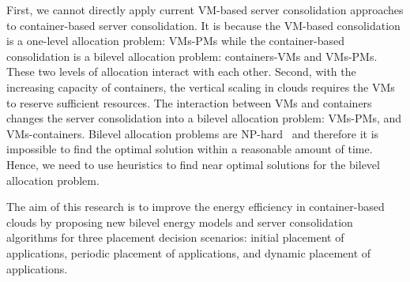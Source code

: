  First, we cannot directly apply current VM-based server consolidation approaches to container-based server consolidation. It is because the VM-based consolidation is a one-level allocation problem: VMs-PMs while the container-based consolidation is a bilevel allocation problem: containers-VMs and VMs-PMs. These two levels of allocation interact with each other. Second, with the increasing capacity of containers, the vertical scaling in clouds requires the VMs to reserve sufficient resources. The interaction between VMs and containers changes 
the server consolidation into a bilevel allocation problem: VMs-PMs, and VMs-containers. Bilevel allocation problems are NP-hard~\cite{Sinha:2013tn} and therefore it is impossible to find the optimal solution within a reasonable amount of time. Hence, we need to use heuristics to find near optimal solutions for the bilevel allocation problem.

The aim of this research is to improve the energy efficiency in container-based clouds by proposing new bilevel energy models and server consolidation algorithms for three placement decision scenarios: 
initial placement of applications, periodic placement of applications, and dynamic placement of applications.


\vspace{5mm}
